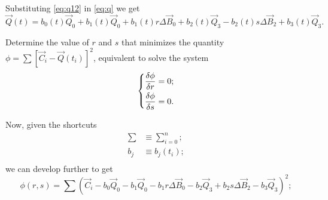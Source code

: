 \documentclass{scrartcl}
\newcommand\V[1]{\vec{#1}}
\begin{document}
Substituting \eqref{eq:q12} in \eqref{eq:q} we get
\begin{equation*}
\V{Q}(t) = b_0(t) \V{Q}_0 + b_1(t) \V{Q}_0 + b_1(t) r \Delta \V{B}_0 +
b_2(t) \V{Q}_3 - b_2(t) s \Delta \V{B}_2 + b_3(t) \V{Q}_3.
\end{equation*}

Determine the value of $r$ and $s$ that minimizes the quantity
$\phi = \sum \left[ \V{C}_i - \V{Q}(t_i) \right]^2$, equivalent to
solve the system
\begin{equation*}
\begin{dcases}
\frac{\delta\phi}{\delta r} = 0;\\
\frac{\delta\phi}{\delta s} = 0.
\end{dcases}
\end{equation*}

Now, given the shortcuts
\begin{equation*}
\begin{split}
    \sum &\equiv \sum_{i=0}^{n}; \\
    b_j &\equiv b_j(t_i); \\
\end{split}
\end{equation*}
we can develop further to get
\begin{equation*}
    \phi(r, s) = \sum \left( \V{C}_i - b_0 \V{Q}_0 - b_1 \V{Q}_0 -
    b_1 r \Delta \V{B}_0 - b_2 \V{Q}_3 + b_2 s \Delta \V{B}_2 - b_3 \V{Q}_3 \right)^2;
\end{equation*}
\end{document}
